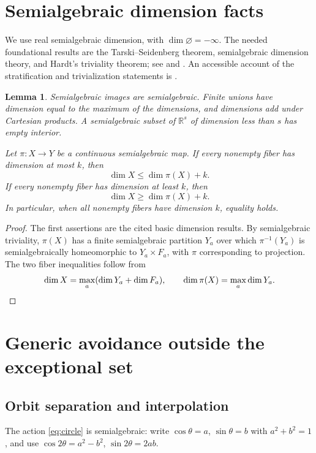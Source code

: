 \documentclass[11pt,reqno]{amsart}
\newtheorem{lemma}[lemma]{Lemma}
\theoremstyle{definition}
\theoremstyle{remark}
\numberwithin{equation}{section}
\newcommand{\R}{\mathbb R}
\begin{document}
\section{Semialgebraic dimension facts}\label{sec:dimension}

We use real semialgebraic dimension, with $\dim\varnothing=-\infty$.
The needed foundational results are the Tarski--Seidenberg theorem,
semialgebraic dimension theory, and Hardt's triviality theorem;
see \cite[Sections 2.2, 2.8, and 9.3]{BCR1998} and \cite{Hardt1980}.
An accessible account of the stratification and trivialization
statements is \cite[Section 2.1]{HLTV2011}.

\begin{lemma}\label{lem:dimension}
Semialgebraic images are semialgebraic. Finite unions have dimension
equal to the maximum of the dimensions, and dimensions add under
Cartesian products. A semialgebraic subset of $\R^s$ of dimension
less than $s$ has empty interior.

Let $\pi:X\to Y$ be a continuous semialgebraic map. If every nonempty
fiber has dimension at most $k$, then
\begin{equation}\label{eq:fiber-upper}
 \dim X\leq\dim\pi(X)+k.
\end{equation}
If every nonempty fiber has dimension at least $k$, then
\begin{equation}\label{eq:fiber-lower}
 \dim X\geq\dim\pi(X)+k.
\end{equation}
In particular, when all nonempty fibers have dimension $k$, equality
holds.
\end{lemma}
\begin{proof}
The first assertions are the cited basic dimension results. By
semialgebraic triviality, $\pi(X)$ has a finite semialgebraic partition
$Y_a$ over which $\pi^{-1}(Y_a)$ is semialgebraically homeomorphic
to $Y_a\times F_a$, with $\pi$ corresponding to projection.
The two fiber inequalities follow from
\[
 \dim X=\max_a(\dim Y_a+\dim F_a),\qquad
 \dim\pi(X)=\max_a\dim Y_a.\qedhere
\]
\end{proof}

\section{Generic avoidance outside the exceptional set}\label{sec:generic}

\subsection{Orbit separation and interpolation}
The action \eqref{eq:circle} is semialgebraic: write
$\cos\theta=a$, $\sin\theta=b$ with $a^2+b^2=1$, and use
$\cos2\theta=a^2-b^2$, $\sin2\theta=2ab$.
\end{document}
